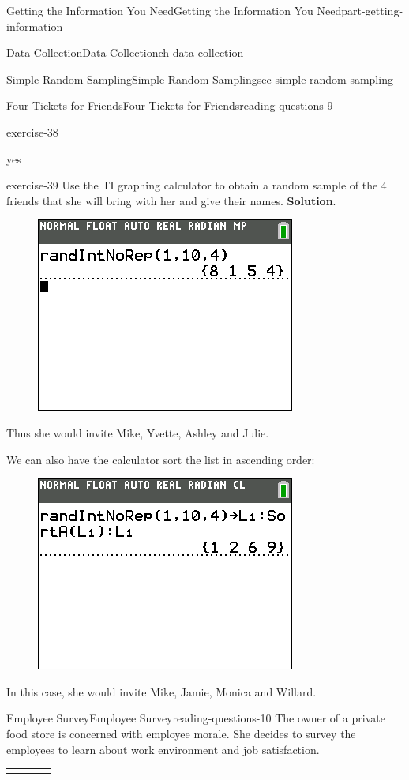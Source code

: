 \documentclass[oneside,10pt,]{book}
\numberwithin{equation}{section}
\newcommand{\hrulethick} {\noalign{\hrule height 0.11em}}
\begin{document}
\begin{partptx}{Getting the Information You Need}{}{Getting the Information You Need}{}{}{part-getting-information}
\begin{chapterptx}{Data Collection}{}{Data Collection}{}{}{ch-data-collection}
\begin{sectionptx}{Simple Random Sampling}{}{Simple Random Sampling}{}{}{sec-simple-random-sampling}
\begin{reading-questions-subsection}{Four Tickets for Friends}{}{Four Tickets for Friends}{}{}{reading-questions-9}
\begin{divisionexercise}{1}{}{}{exercise-38}
\begin{enumerate}[label=(\alph*)]
yes%
\end{enumerate}
\end{divisionexercise}%
\begin{divisionexercise}{2}{}{}{exercise-39}%
Use the TI graphing calculator to obtain a random sample of the 4 friends that she will bring with her and give their names. \textbf{Solution}.\hypertarget{solution-1}{}\quad%
\begin{figure}\centering\includegraphics[width=0.4\linewidth]{images/four-friends.png}
\end{figure}\hypertarget{p-15}{}%
Thus she would invite Mike, Yvette, Ashley and Julie.%
\par
\hypertarget{p-16}{}%
We can also have the calculator sort the list in ascending order:%
\begin{figure}\centering\includegraphics[width=0.4\linewidth]{images/four-friends-sorted.png}
\end{figure}\hypertarget{p-17}{}%
In this case, she would invite Mike, Jamie, Monica and Willard.%
\end{divisionexercise}%
\end{reading-questions-subsection}
%
%
\typeout{************************************************}
\typeout{************************************************}
%
\begin{reading-questions-subsection}{Employee Survey}{}{Employee Survey}{}{}{reading-questions-10}
\hypertarget{p-18}{}%
The owner of a private food store is concerned with employee morale. She decides to survey the employees to learn about work environment and job satisfaction. \begin{tabular}{llll}\hrulethick

\end{tabular}
\end{reading-questions-subsection}
\end{sectionptx}
\end{chapterptx}
\end{partptx}
\end{document}

